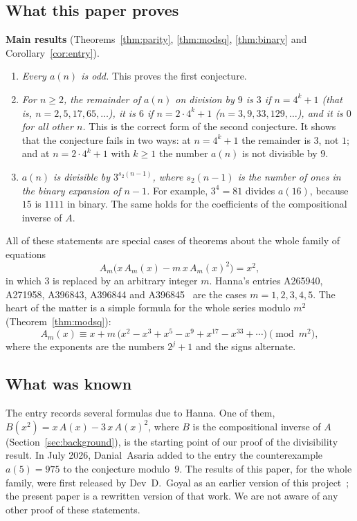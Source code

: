 \documentclass[11pt,a4paper]{article}
\theoremstyle{definition}
\theoremstyle{remark}
\begin{document}
\subsection{What this paper proves}
\textbf{Main results} (Theorems~\ref{thm:parity}, \ref{thm:modsq}, \ref{thm:binary} and Corollary~\ref{cor:entry}).
\begin{enumerate}
\item \emph{Every $a(n)$ is odd.} This proves the first conjecture.
\item \emph{For $n\ge2$, the remainder of $a(n)$ on division by $9$ is $3$ if $n=4^k+1$ (that is, $n=2,5,17,65,\dots$), it is
$6$ if $n=2\cdot4^k+1$ ($n=3,9,33,129,\dots$), and it is $0$ for all other $n$.} This is the correct form of the second
conjecture. It shows that the conjecture fails in two ways: at $n=4^k+1$ the remainder is $3$, not $1$; and at
$n=2\cdot4^k+1$ with $k\ge1$ the number $a(n)$ is not divisible by $9$.
\item \emph{$a(n)$ is divisible by $3^{s_2(n-1)}$, where $s_2(n-1)$ is the number of ones in the binary expansion of
$n-1$.} For example, $3^4=81$ divides $a(16)$, because $15$ is $1111$ in binary. The same holds for the coefficients of
the compositional inverse of $A$.
\end{enumerate}

All of these statements are special cases of theorems about the whole family of equations
\[
A_m\bigl(x\,A_m(x)-m\,x\,A_m(x)^2\bigr)=x^2,
\]
in which $3$ is replaced by an arbitrary integer $m$. Hanna's entries A265940, A271958, A396843,
A396844 and A396845~\cite{oeis1,oeis2,oeis3,oeis4,oeis5} are the cases $m=1,2,3,4,5$. The heart of the matter is a
simple formula for the whole series modulo $m^2$ (Theorem~\ref{thm:modsq}):
\[
A_m(x)\equiv x+m\,\bigl(x^2-x^3+x^5-x^9+x^{17}-x^{33}+\cdots\bigr)\pmod{m^2},
\]
where the exponents are the numbers $2^j+1$ and the signs alternate.

\subsection{What was known}
The entry records several formulas due to Hanna. One of them, $B(x^2)=x\,A(x)-3\,x\,A(x)^2$, where $B$ is
the compositional inverse of $A$ (Section~\ref{sec:background}), is the starting point of our proof of the divisibility
result. In July 2026, Danial~Asaria added to the entry the counterexample $a(5)=975$ to the conjecture modulo~$9$.
The results of this paper, for the whole family, were first released by Dev~D.~Goyal as an earlier version of this
project~\cite{zenodo}; the present paper is a rewritten version of that work.
We are not aware of any other proof of these statements.
\end{document}
